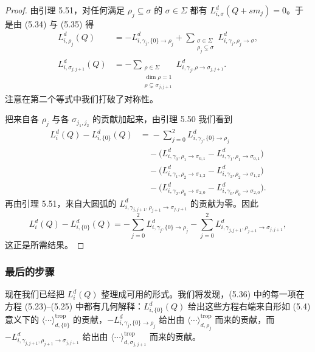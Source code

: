 \begin{proof}
由引理 5.51，对任何满足 $\rho_j\subseteq\sigma$ 的 $\sigma\in\Sigma$ 都有 $L^d_{i,\sigma}(Q+sm_j)=0$。于是由 (5.34) 与 (5.35) 得
\[
  \begin{aligned}
    L^d_{i,\rho_j}(Q)&=-L^d_{i,\gamma_j,\{0\}\to\rho_j}
      +\sum_{\substack{\sigma\in\Sigma\\ \rho_j\subsetneq\sigma}}L^d_{i,\gamma_j,\rho_j\to\sigma},\\
    L^d_{i,\sigma_{j,j+1}}(Q)&=-\sum_{\substack{\rho\in\Sigma\\ \dim\rho=1\\ \rho\subsetneq\sigma_{j,j+1}}}L^d_{i,\gamma_j,\rho\to\sigma_{j,j+1}}.
  \end{aligned}
\]
注意在第二个等式中我们打破了对称性。

把来自各 $\rho_j$ 与各 $\sigma_{j_1,j_2}$ 的贡献加起来，由引理 5.50 我们看到
\[
  \begin{aligned}
    L^d_i(Q)-L^d_{i,\{0\}}(Q)
    &={}-\sum_{j=0}^{2}L^d_{i,\gamma_j,\{0\}\to\rho_j}\\
    &\quad-\bigl(L^d_{i,\gamma_0,\rho_1\to\sigma_{0,1}}-L^d_{i,\gamma_1,\rho_1\to\sigma_{0,1}}\bigr)\\
    &\quad-\bigl(L^d_{i,\gamma_1,\rho_2\to\sigma_{1,2}}-L^d_{i,\gamma_2,\rho_2\to\sigma_{1,2}}\bigr)\\
    &\quad-\bigl(L^d_{i,\gamma_2,\rho_0\to\sigma_{2,0}}-L^d_{i,\gamma_0,\rho_0\to\sigma_{2,0}}\bigr).
  \end{aligned}
\]
再由引理 5.51，来自大圆弧的 $L^d_{i,\gamma_{j,j+1},\rho_{j+1}\to\sigma_{j,j+1}}$ 的贡献为零。因此
\[
  L^d_i(Q)-L^d_{i,\{0\}}(Q)
  =-\sum_{j=0}^{2}L^d_{i,\gamma_j,\{0\}\to\rho_j}
  -\sum_{j=0}^{2}L^d_{i,\gamma_{j,j+1},\rho_{j+1}\to\sigma_{j,j+1}},
\]
这正是所需结果。
\end{proof}

\subsubsection{最后的步骤}

现在我们已经把 $L^d_i(Q)$ 整理成可用的形式。我们将发现，(5.36) 中的每一项在方程 (5.23)–(5.25) 中都有几何解释：$L^d_{i,\{0\}}(Q)$ 给出这些方程右端来自形如 (5.4) 意义下的 $\langle\cdots\rangle^{\mathrm{trop}}_{d,\{0\}}$ 的贡献，$-L^d_{i,\gamma_j,\{0\}\to\rho_j}$ 给出由 $\langle\cdots\rangle^{\mathrm{trop}}_{d,\rho_j}$ 而来的贡献，而 $-L^d_{i,\gamma_{j,j+1},\rho_{j+1}\to\sigma_{j,j+1}}$ 给出由 $\langle\cdots\rangle^{\mathrm{trop}}_{d,\sigma_{j,j+1}}$ 而来的贡献。

